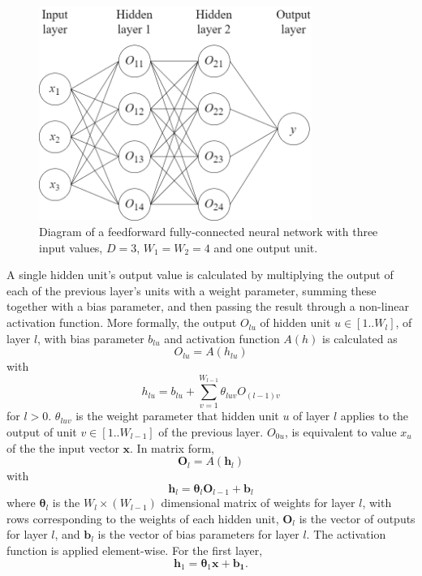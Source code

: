 \documentclass[12pt]{article}
\begin{document}
\begin{figure}[h]
\centering
\includegraphics[width=3.5in]{images/feedforward_nn.png}
\caption{Diagram of a feedforward fully-connected neural network with three input values, $D=3$, $W_1=W_2=4$ and one output unit.}
\end{figure}

A single hidden unit's output value is calculated by multiplying the output of each of the previous layer's units with a weight parameter, summing these together with a bias parameter, and then passing the result through a non-linear activation function. More formally, the output $O_{lu}$ of hidden unit $u\in[1..W_l]$, of layer $l$, with bias parameter $b_{lu}$ and activation function $A(h)$ is calculated as
\begin{equation}
O_{lu}=A(h_{lu})
\end{equation}
with
\begin{equation}
h_{lu}=b_{lu}+\sum_{v=1}^{W_{l-1}}\theta_{luv}O_{(l-1)v}
\end{equation}
for $l > 0$. $\theta_{luv}$ is the weight parameter that hidden unit $u$ of layer $l$ applies to the output of unit $v\in[1..W_{l-1}]$ of the previous layer. $O_{0u}$, is equivalent to value $x_u$ of the the input vector $\bm{x}$. In matrix form,
\begin{equation}
\bm{O}_l=A(\bm{h}_l)
\end{equation}
with
\begin{equation}
\bm{h}_l=\boldsymbol\theta_l\bm{O}_{l-1}+\bm{b}_l
\end{equation}
where $\boldsymbol\theta_l$ is the $W_l \times \left(W_{l-1}\right)$ dimensional matrix of weights for layer $l$, with rows corresponding to the weights of each hidden unit, $\bm{O}_l$ is the vector of outputs for layer $l$, and $\bm{b}_l$ is the vector of bias parameters for layer $l$. The activation function is applied element-wise. For the first layer,
\begin{equation}
\bm{h}_1=\boldsymbol\theta_1\bm{x}+\bm{b_1}.
\end{equation}
\end{document}
